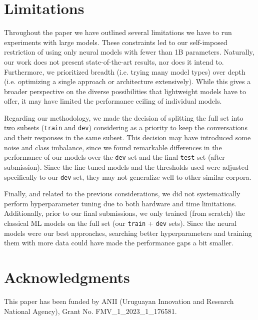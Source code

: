 \documentclass[11pt]{article}
\begin{document}
\section{Limitations}
\label{sec:limitations}

Throughout the paper we have outlined several limitations we have to run experiments with large models.
These constraints led to our self-imposed restriction of using only neural models with fewer than 1B parameters.
Naturally, our work does not present state-of-the-art results, nor does it intend to. 
Furthermore, we prioritized breadth (i.e. trying many model types) over depth (i.e. optimizing a single approach or architecture extensively). 
While this gives a broader perspective on the diverse possibilities that lightweight models have to offer, it may have limited the performance ceiling of individual models.

Regarding our methodology, we made the decision of splitting the full set into two subsets (\texttt{train} and \texttt{dev}) considering as a priority to keep the conversations and their responses in the same subset.
This decision may have introduced some noise and class imbalance, since we found remarkable differences in the performance of our models over the \texttt{dev} set and the final \texttt{test} set (after submission).
Since the fine-tuned models and the thresholds used were adjusted specifically to our \texttt{dev} set, they may not generalize well to other similar corpora. 

Finally, and related to the previous considerations, we did not systematically perform hyperparameter tuning due to both hardware and time limitations.
Additionally, prior to our final submissions, we only trained (from scratch) the classical ML models on the full set (our \texttt{train} + \texttt{dev} sets).
Since the neural models were our best approaches, searching better hyperparameters and training them with more data could have made the performance gaps a bit smaller.


\section{Acknowledgments}

This paper has been funded by ANII (Uruguayan Innovation and Research National Agency), Grant No. FMV\_1\_2023\_1\_176581.
\end{document}
